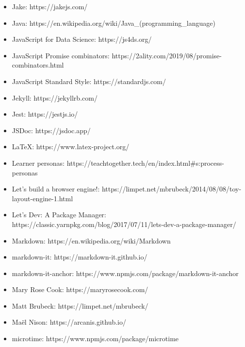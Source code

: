 \documentclass[krantzl]{krantz}
\begin{document}
\begin{itemize}
\item Jake: https://jakejs.com/

\item Java: https://en.wikipedia.org/wiki/Java\_(programming\_language)

\item JavaScript for Data Science: https://js4ds.org/

\item JavaScript Promise combinators: https://2ality.com/2019/08/promise-combinators.html

\item JavaScript Standard Style: https://standardjs.com/

\item Jekyll: https://jekyllrb.com/

\item Jest: https://jestjs.io/

\item JSDoc: https://jsdoc.app/

\item LaTeX: https://www.latex-project.org/

\item Learner personas: https://teachtogether.tech/en/index.html\#s:process-personas

\item Let's build a browser engine!: https://limpet.net/mbrubeck/2014/08/08/toy-layout-engine-1.html

\item Let's Dev: A Package Manager: https://classic.yarnpkg.com/blog/2017/07/11/lets-dev-a-package-manager/

\item Markdown: https://en.wikipedia.org/wiki/Markdown

\item markdown-it: https://markdown-it.github.io/

\item markdown-it-anchor: https://www.npmjs.com/package/markdown-it-anchor

\item Mary Rose Cook: https://maryrosecook.com/

\item Matt Brubeck: https://limpet.net/mbrubeck/

\item Maël Nison: https://arcanis.github.io/

\item microtime: https://www.npmjs.com/package/microtime


\end{itemize}
\end{document}
